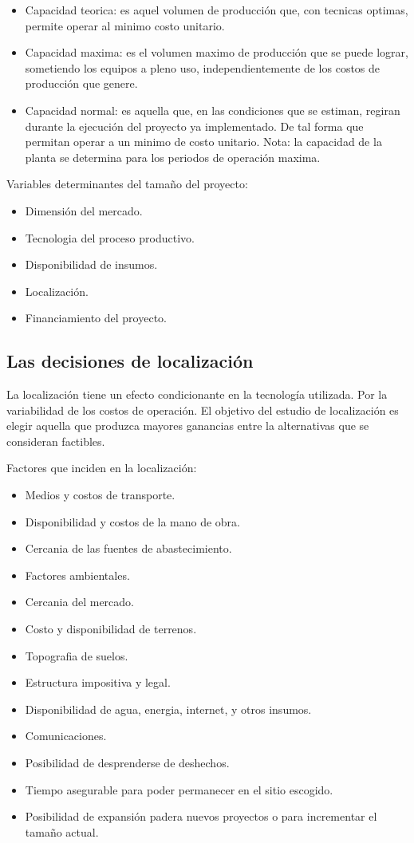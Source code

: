 \documentclass[a4paper, 11pt, oneside]{article}
\begin{document}
\begin{itemize}
	\item Capacidad teorica: es aquel volumen de producción que, con tecnicas optimas, permite operar al minimo costo
	      unitario.
	\item Capacidad maxima: es el volumen maximo de producción que se puede lograr, sometiendo los equipos a pleno
	      uso, independientemente de los costos de producción que genere.
	\item Capacidad normal: es aquella que, en las condiciones que se estiman, regiran durante la ejecución del proyecto
	      ya implementado. De tal forma que permitan operar a un minimo de costo unitario. Nota: la capacidad de la planta
	      se determina para los periodos de operación maxima.
\end{itemize}

Variables determinantes del tamaño del proyecto:

\begin{itemize}
	\item Dimensión del mercado.
	\item Tecnologia del proceso productivo.
	\item Disponibilidad de insumos.
	\item Localización.
	\item Financiamiento del proyecto.
\end{itemize}

\subsection{Las decisiones de localización}
La localización tiene un efecto condicionante en la tecnología utilizada. Por la variabilidad de los costos de operación. El objetivo
del estudio de localización es elegir aquella que produzca mayores ganancias entre la alternativas que se consideran factibles.

Factores que inciden en la localización:

\begin{itemize}
	\item Medios y costos de transporte.
	\item Disponibilidad y costos de la mano de obra.
	\item Cercania de las fuentes de abastecimiento.
	\item Factores ambientales.
	\item Cercania del mercado.
	\item Costo y disponibilidad de terrenos.
	\item Topografia de suelos.
	\item Estructura impositiva y legal.
	\item Disponibilidad de agua, energia, internet, y otros insumos.
	\item Comunicaciones.
	\item Posibilidad de desprenderse de deshechos.
	\item Tiempo asegurable para poder permanecer en el sitio escogido.
	\item Posibilidad de expansión padera nuevos proyectos o para incrementar el tamaño actual.
\end{itemize} 
\end{document}
